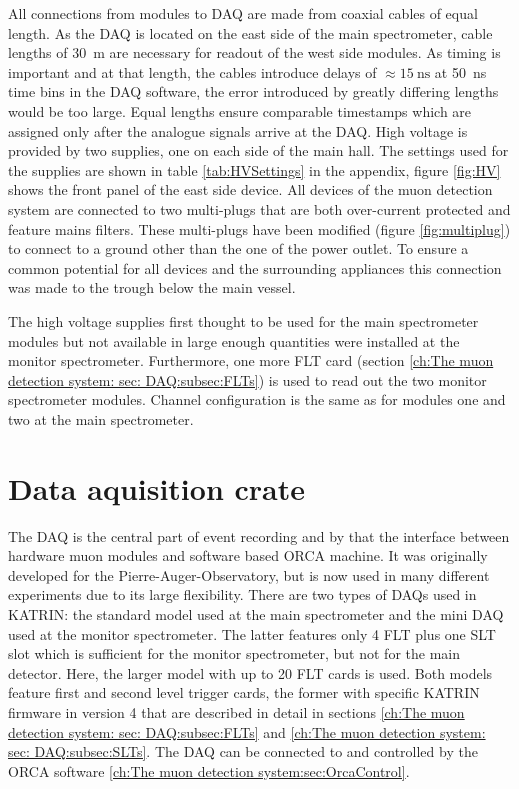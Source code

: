   All connections from modules to DAQ are made from coaxial cables of equal length. As the DAQ is located on the east side of the main spectrometer, cable lengths of \SI{30}{\meter} are necessary for readout of the west side modules. As timing is important and at that length, the cables introduce delays of $\approx \SI{15}{\nano\second}$ at \SI{50}{\nano\second} time bins in the DAQ software, the error introduced by greatly differing lengths would be too large. Equal lengths ensure comparable timestamps which are assigned only after the analogue signals arrive at the DAQ. High voltage is provided by two supplies, one on each side of the main hall. The settings used for the supplies are shown in table \ref{tab:HVSettings} in the appendix, figure \ref{fig:HV} shows the front panel of the east side device.
  All devices of the muon detection system are connected to two multi-plugs that are both over-current protected and feature mains filters. These multi-plugs have been modified (figure \ref{fig:multiplug}) to connect to a ground other than the one of the power outlet. To ensure a common potential for all devices and the surrounding appliances this connection was made to the trough below the main vessel.

  The high voltage supplies first thought to be used for the main spectrometer modules but not available in large enough quantities were installed at the monitor spectrometer. Furthermore, one more FLT card (section \ref{ch:The muon detection system: sec: DAQ:subsec:FLTs}) is used to read out the two monitor spectrometer modules. Channel configuration is the same as for modules one and two at the main spectrometer.



\section{Data aquisition crate}
\label{ch:The muon detection system: sec: DAQ}
The DAQ is the central part of event recording and by that the interface between hardware muon modules and software based ORCA machine. It was originally developed for the Pierre-Auger-Observatory, but is now used in many different experiments due to its large flexibility. There are two types of DAQs used in KATRIN: the standard model used at the main spectrometer and the mini DAQ used at the monitor spectrometer. The latter features only 4 FLT plus one SLT slot which is sufficient for the monitor spectrometer, but not for the main detector. Here, the larger model with up to 20 FLT cards is used. Both models feature first and second level trigger cards, the former with specific KATRIN firmware in version \SI{4}{} that are described in detail in sections \ref{ch:The muon detection system: sec: DAQ:subsec:FLTs} and \ref{ch:The muon detection system: sec: DAQ:subsec:SLTs}. The DAQ can be connected to and controlled by the ORCA software \ref{ch:The muon detection system:sec:OrcaControl}. 


